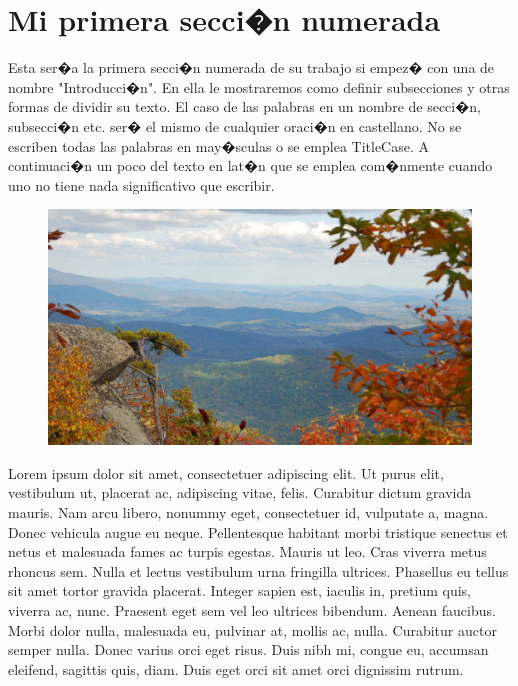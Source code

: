 \documentclass[10pt,twoside]{rcmart} %
\begin{document}

\section{Mi primera secci�n numerada}

Esta ser�a la primera secci�n numerada de su trabajo si empez� con una de nombre "Introducci�n". En ella le mostraremos como definir subsecciones y otras formas de dividir su texto. El caso de las palabras en un nombre de secci�n, subsecci�n etc. ser� el mismo de cualquier oraci�n en castellano. No se escriben todas las palabras en may�sculas o se emplea TitleCase. A continuaci�n un poco del texto en lat�n que se emplea com�nmente cuando uno no tiene nada significativo que escribir.

\begin{figure}[ht]\centering %
	\includegraphics[width=\linewidth]{view}
	\label{fig:view}
\end{figure}

Lorem ipsum dolor sit amet, consectetuer adipiscing elit. Ut purus elit, vestibulum ut, placerat ac, adipiscing vitae, felis. Curabitur dictum gravida mauris. Nam arcu libero, nonummy eget, consectetuer id, vulputate a, magna. Donec vehicula augue eu neque. Pellentesque habitant morbi tristique senectus et netus et malesuada fames ac turpis egestas. Mauris ut leo. Cras viverra metus rhoncus sem. Nulla et lectus vestibulum urna fringilla ultrices. Phasellus eu tellus sit amet tortor gravida placerat. Integer sapien est, iaculis in, pretium quis, viverra ac, nunc. Praesent eget sem vel leo ultrices bibendum. Aenean faucibus. Morbi dolor nulla, malesuada eu, pulvinar at, mollis ac, nulla. Curabitur auctor semper nulla. Donec varius orci eget risus. Duis nibh mi, congue eu, accumsan eleifend, sagittis quis, diam. Duis eget orci sit amet orci dignissim rutrum.
\end{document}
